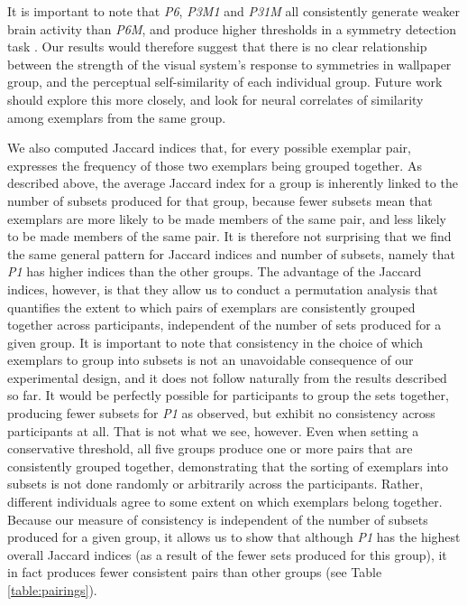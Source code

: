 \documentclass[11pt, twoside]{article}
\begin{document}
It is important to note that \textit{P6}, \textit{P3M1} and \textit{P31M} all consistently generate weaker brain activity than \textit{P6M}, and produce higher thresholds in a symmetry detection task \citep{kohler_clarke_2021}. Our results would therefore suggest that there is no clear relationship between the strength of the visual system's response to symmetries in wallpaper group, and the perceptual self-similarity of each individual group. Future work should explore this more closely, and look for neural correlates of similarity among exemplars from the same group.

We also computed Jaccard indices that, for every possible exemplar pair, expresses the frequency of those two exemplars being grouped together. As described above, the average Jaccard index for a group is inherently linked to the number of subsets produced for that group, because fewer subsets mean that exemplars are more likely to be made members of the same pair, and less likely to be made members of the same pair. It is therefore not surprising that we find the same general pattern for Jaccard indices and number of subsets, namely that \textit{P1} has higher indices than the other groups. The advantage of the Jaccard indices, however, is that they allow us to conduct a permutation analysis that quantifies the extent to which pairs of exemplars are consistently grouped together across participants, independent of the number of sets produced for a given group. It is important to note that consistency in the choice of which exemplars to group into subsets is not an unavoidable consequence of our experimental design, and it does not follow naturally from the results described so far. It would be perfectly possible for participants to group the sets together, producing fewer subsets for \textit{P1} as observed, but exhibit no consistency across participants at all. That is not what we see, however. Even when setting a conservative threshold, all five groups produce one or more pairs that are consistently grouped together, demonstrating that the sorting of exemplars into subsets is not done randomly or arbitrarily across the participants. Rather, different individuals agree to some extent on which exemplars belong together. Because our measure of consistency is independent of the number of subsets produced for a given group, it allows us to show that although \textit{P1} has the highest overall Jaccard indices (as a result of the fewer sets produced for this group), it in fact produces fewer consistent pairs than other groups (see Table \ref{table:pairings}).
\end{document}
